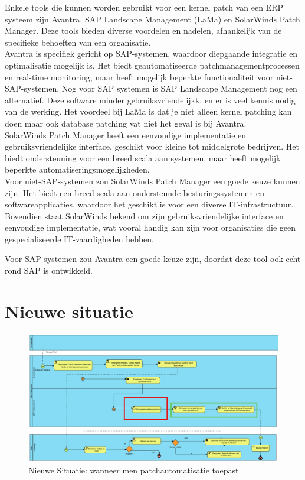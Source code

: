 Enkele tools die kunnen worden gebruikt voor een kernel patch van een ERP systeem zijn Avantra, SAP Landscape Management (LaMa) en SolarWinds Patch Manager. Deze tools bieden diverse voordelen en nadelen, afhankelijk van de specifieke behoeften van een organisatie. \\
 Avantra is specifiek gericht op SAP-systemen, waardoor diepgaande integratie en optimalisatie mogelijk is. Het biedt geautomatiseerde patchmanagementprocessen en real-time monitoring, maar heeft 
 mogelijk beperkte functionaliteit voor niet-SAP-systemen. Nog voor SAP systemen is SAP Landscape Management nog een alternatief. Deze software minder gebruiksvriendelijkk, en er is veel kennis nodig van de werking. Het voordeel 
 bij LaMa is dat je niet alleen kernel patching kan doen maar ook database patching vat niet het geval is bij Avantra. \\
 SolarWinds Patch Manager heeft een eenvoudige implementatie en gebruiksvriendelijke interface, geschikt voor kleine tot middelgrote bedrijven. Het biedt ondersteuning voor een breed scala aan 
 systemen, maar heeft mogelijk beperkte automatiseringsmogelijkheden. \\


 Voor niet-SAP-systemen zou SolarWinds Patch Manager een goede keuze kunnen zijn. Het biedt een breed scala aan ondersteunde besturingssystemen en softwareapplicaties, waardoor het geschikt is voor
  een diverse IT-infrastructuur. Bovendien staat SolarWinds bekend om zijn gebruiksvriendelijke interface en eenvoudige implementatie, wat vooral handig kan zijn voor organisaties die geen gespecialiseerde IT-vaardigheden hebben.
 
Voor SAP systemen zou Avantra een goede keuze zijn, doordat deze tool ook echt rond SAP is ontwikkeld. \\

\section{Nieuwe situatie}
\begin{figure}[htbp]
    \centering
    \includegraphics[width=\textwidth]{nieuwesituatie.png}
    \caption{Nieuwe Situatie: wanneer men patchautomatisatie toepast}
     \label{fig:nieuwesituatie}
\end{figure}

